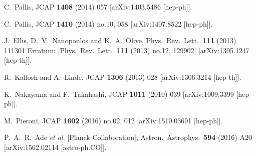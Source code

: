 \begin{thebibliography}{10}
  C.~Pallis,
  JCAP {\bf 1408} (2014) 057
  [arXiv:1403.5486 [hep-ph]].


  C.~Pallis,
  JCAP {\bf 1410} (2014) no.10,  058
  [arXiv:1407.8522 [hep-ph]].


  J.~Ellis, D.~V.~Nanopoulos and K.~A.~Olive,
  Phys.\ Rev.\ Lett.\  {\bf 111} (2013) 111301
   Erratum: [Phys.\ Rev.\ Lett.\  {\bf 111} (2013) no.12,  129902]
  [arXiv:1305.1247 [hep-th]].


  R.~Kallosh and A.~Linde,
  JCAP {\bf 1306} (2013) 028
  [arXiv:1306.3214 [hep-th]].


  K.~Nakayama and F.~Takahashi,
  JCAP {\bf 1011} (2010) 039
  [arXiv:1009.3399 [hep-ph]].

  M.~Pieroni,
  JCAP {\bf 1602} (2016) no.02,  012
  [arXiv:1510.03691 [hep-ph]].


  P.~A.~R.~Ade {\it et al.} [Planck Collaboration],
  Astron.\ Astrophys.\  {\bf 594} (2016) A20
  [arXiv:1502.02114 [astro-ph.CO]].



\end{thebibliography}
